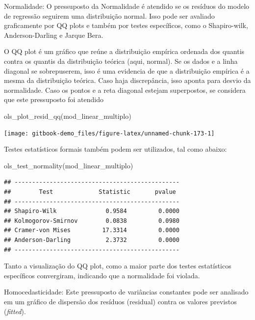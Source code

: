\documentclass[
]{book}
\newenvironment{Shaded}{\begin{snugshade}}{\end{snugshade}}
\newcommand{\FunctionTok}[1]{\textcolor[rgb]{0.00,0.00,0.00}{#1}}
\newcommand{\NormalTok}[1]{#1}
\begin{document}
Normalidade: O pressuposto da Normalidade é atendido se os resíduos do modelo de regressão seguirem uma distribuição normal. Isso pode ser avaliado graficamente por QQ plots e também por testes específicos, como o Shapiro-wilk, Anderson-Darling e Jarque Bera.

O QQ plot é um gráfico que reúne a distribuição empírica ordenada dos quantis contra os quantis da distribuição teórica (aqui, normal). Se os dados e a linha diagonal se sobrepuserem, isso é uma evidencia de que a distribuição empírica é a mesma da distribuição teórica. Caso haja discrepância, isso aponta para desvio da normalidade. Caso os pontos e a reta diagonal estejam superpostos, se considera que este pressuposto foi atendido

\begin{Shaded}
\begin{Highlighting}[]
\FunctionTok{ols\_plot\_resid\_qq}\NormalTok{(mod\_linear\_multiplo)}
\end{Highlighting}
\end{Shaded}

\begin{center}\texttt{[image: gitbook-demo\_files/figure-latex/unnamed-chunk-173-1]} \end{center}

Testes estatísticos formais também podem ser utilizados, tal como abaixo:

\begin{Shaded}
\begin{Highlighting}[]
\FunctionTok{ols\_test\_normality}\NormalTok{(mod\_linear\_multiplo)}
\end{Highlighting}
\end{Shaded}

\begin{verbatim}
## -----------------------------------------------
##        Test             Statistic       pvalue  
## -----------------------------------------------
## Shapiro-Wilk              0.9584         0.0000 
## Kolmogorov-Smirnov        0.0838         0.0980 
## Cramer-von Mises         17.3314         0.0000 
## Anderson-Darling          2.3732         0.0000 
## -----------------------------------------------
\end{verbatim}

Tanto a visualização do QQ plot, como a maior parte dos testes estatísticos específicos convergiram, indicando que a normalidade foi violada.

Homocedasticidade: Este pressuposto de variâncias constantes pode ser analisado em um gráfico de dispersão dos resíduos (residual) contra os valores previstos (\emph{fitted}).
\end{document}
